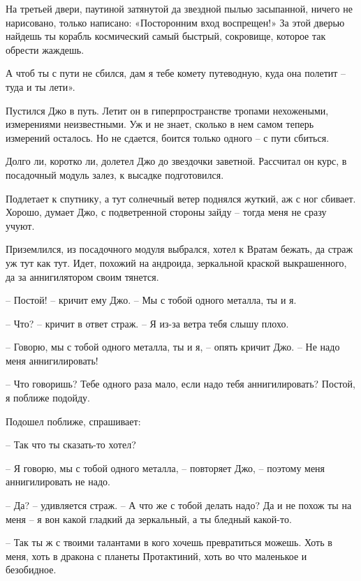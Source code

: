 \documentclass[ebook,oneside,final,openright]{memoir}
\begin{document}
\par
На третьей двери, паутиной затянутой да звездной пылью засыпанной, ничего не нарисовано, только написано: «Посторонним вход воспрещен!» За этой дверью найдешь ты корабль космический самый быстрый, сокровище, которое так обрести жаждешь.\par
\par
А чтоб ты с пути не сбился, дам я тебе комету путеводную, куда она полетит – туда и ты лети».\par
\par
Пустился Джо в путь. Летит он в гиперпространстве тропами нехожеными, измерениями неизвестными. Уж и не знает, сколько в нем самом теперь измерений осталось. Но не сдается, боится только одного – с пути сбиться.\par
\par
Долго ли, коротко ли, долетел Джо до звездочки заветной. Рассчитал он курс, в посадочный модуль залез, к высадке подготовился.\par
\par
Подлетает к спутнику, а тут солнечный ветер поднялся жуткий, аж с ног сбивает. Хорошо, думает Джо, с подветренной стороны зайду – тогда меня не сразу учуют. \par
\par
 Приземлился, из посадочного модуля выбрался, хотел к Вратам бежать, да страж уж тут как тут. Идет, похожий на андроида, зеркальной краской выкрашенного, да за аннигилятором своим тянется. \par
 \par
– Постой! – кричит ему Джо. – Мы с тобой одного металла, ты и я. \par
– Что? – кричит в ответ страж. – Я из-за ветра тебя слышу плохо. \par
– Говорю, мы с тобой одного металла, ты и я, – опять кричит Джо. – Не надо меня аннигилировать!\par
– Что говоришь? Тебе одного раза мало, если надо тебя аннигилировать? Постой, я поближе подойду. \par
Подошел поближе, спрашивает: \par
– Так что ты сказать-то хотел? \par
– Я говорю, мы с тобой одного металла, – повторяет Джо, – поэтому меня аннигилировать не надо. \par
– Да? – удивляется страж. – А что же с тобой делать надо? Да и не похож ты на меня – я вон какой гладкий да зеркальный, а ты бледный какой-то. \par
– Так ты ж с твоими талантами в кого хочешь превратиться можешь. Хоть в меня, хоть в дракона с планеты Протактиний, хоть во что маленькое и безобидное. \par
\end{document}
